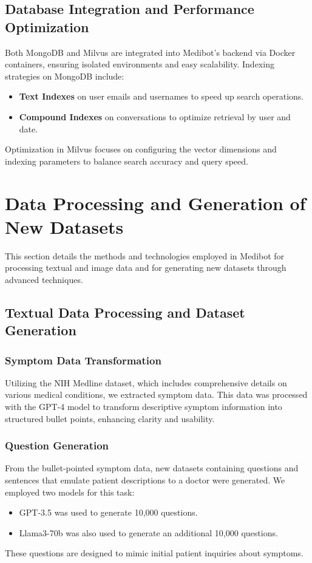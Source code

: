 \subsection{Database Integration and Performance Optimization}
Both MongoDB and Milvus are integrated into Medibot's backend via Docker containers, ensuring isolated environments and easy scalability. Indexing strategies on MongoDB include:
\begin{itemize}
    \item \textbf{Text Indexes} on user emails and usernames to speed up search operations.
    \item \textbf{Compound Indexes} on conversations to optimize retrieval by user and date.
\end{itemize}
Optimization in Milvus focuses on configuring the vector dimensions and indexing parameters to balance search accuracy and query speed.





\section{Data Processing and Generation of New Datasets}
This section details the methods and technologies employed in Medibot for processing textual and image data and for generating new datasets through advanced techniques.

\subsection{Textual Data Processing and Dataset Generation}
\subsubsection{Symptom Data Transformation}
Utilizing the NIH Medline dataset, which includes comprehensive details on various medical conditions, we extracted symptom data. This data was processed with the GPT-4 model to transform descriptive symptom information into structured bullet points, enhancing clarity and usability.

\subsubsection{Question Generation}
From the bullet-pointed symptom data, new datasets containing questions and sentences that emulate patient descriptions to a doctor were generated. We employed two models for this task:
\begin{itemize}
    \item GPT-3.5 was used to generate 10,000 questions.
    \item Llama3-70b was also used to generate an additional 10,000 questions.
\end{itemize}
These questions are designed to mimic initial patient inquiries about symptoms.

